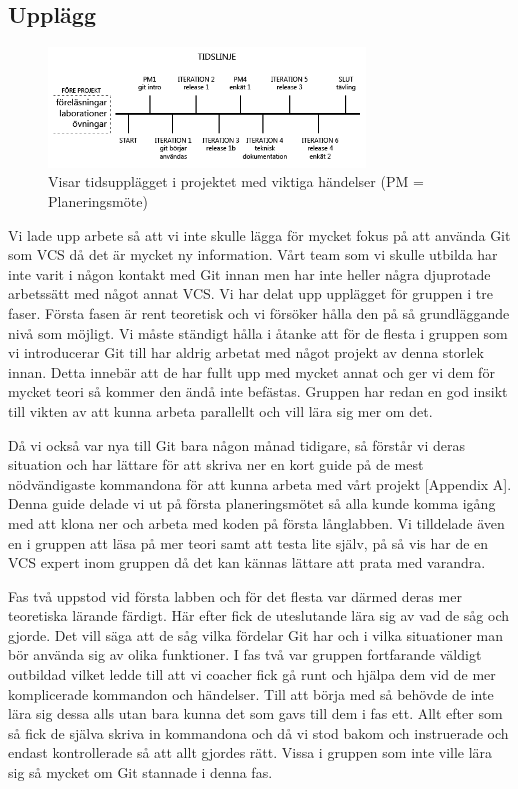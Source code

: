 \subsection{Upplägg}
\label{Upplagg}

\begin{figure}[htb!]\centering\includegraphics[width=0.75\textwidth]{Tidslinje.png}\caption{Visar tidsupplägget i projektet med viktiga händelser (PM = Planeringsmöte)}\label{fig:Timeline}\end{figure}

Vi lade upp arbete så att vi inte skulle lägga för mycket fokus på att använda Git som VCS då det är mycket ny information. Vårt team som vi skulle utbilda har inte varit i någon kontakt med Git innan men har inte heller några djuprotade arbetssätt med något annat VCS. Vi har delat upp upplägget för gruppen i tre faser. Första fasen är rent teoretisk och vi försöker hålla den på så grundläggande nivå som möjligt. Vi måste ständigt hålla i åtanke att för de flesta i gruppen som vi introducerar Git till har aldrig arbetat med något projekt av denna storlek innan. Detta innebär att de har fullt upp med mycket annat och ger vi dem för mycket teori så kommer den ändå inte befästas. Gruppen har redan en god insikt till vikten av att kunna arbeta parallellt och vill lära sig mer om det. 

Då vi också var nya till Git bara någon månad tidigare, så förstår vi deras situation och har lättare för att skriva ner en kort guide på de mest nödvändigaste kommandona för att kunna arbeta med vårt projekt [Appendix A]. Denna guide delade vi ut på första planeringsmötet så alla kunde komma igång med att klona ner och arbeta med koden på första långlabben. Vi tilldelade även en i gruppen att läsa på mer teori samt att testa lite själv, på så vis har de en VCS expert inom gruppen då det kan kännas lättare att prata med varandra.
 
Fas två uppstod vid första labben och för det flesta var därmed deras mer teoretiska lärande färdigt. Här efter fick de uteslutande lära sig av vad de såg och gjorde. Det vill säga att de såg vilka fördelar Git har och i vilka situationer man bör  använda sig av olika funktioner. I fas två var gruppen fortfarande väldigt outbildad vilket ledde till att vi coacher fick gå  runt och hjälpa dem vid de mer komplicerade kommandon och händelser. Till att börja med så behövde de inte lära sig dessa alls utan bara kunna det som gavs till dem i fas ett. Allt efter som så fick de själva skriva in kommandona och då vi stod bakom och instruerade och endast kontrollerade så att allt gjordes rätt. Vissa i gruppen som inte ville lära sig så mycket om Git stannade i denna fas.


